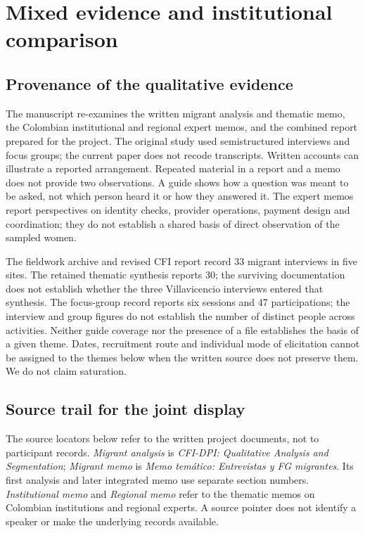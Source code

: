 \section{Mixed evidence and institutional comparison}
\subsection{Provenance of the qualitative evidence}
The manuscript re-examines the written migrant analysis and thematic memo, the Colombian institutional and regional expert memos, and the combined report prepared for the project. The original study used semistructured interviews and focus groups; the current paper does not recode transcripts. Written accounts can illustrate a reported arrangement. Repeated material in a report and a memo does not provide two observations. A guide shows how a question was meant to be asked, not which person heard it or how they answered it. The expert memos report perspectives on identity checks, provider operations, payment design and coordination; they do not establish a shared basis of direct observation of the sampled women.

The fieldwork archive and revised CFI report record 33 migrant interviews in five sites. The retained thematic synthesis reports 30; the surviving documentation does not establish whether the three Villavicencio interviews entered that synthesis. The focus-group record reports six sessions and 47 participations; the interview and group figures do not establish the number of distinct people across activities. Neither guide coverage nor the presence of a file establishes the basis of a given theme. Dates, recruitment route and individual mode of elicitation cannot be assigned to the themes below when the written source does not preserve them. We do not claim saturation.

\subsection{Source trail for the joint display}
The source locators below refer to the written project documents, not to participant records. \emph{Migrant analysis} is \emph{CFI-DPI: Qualitative Analysis and Segmentation}; \emph{Migrant memo} is \emph{Memo temático: Entrevistas y FG migrantes}. Its first analysis and later integrated memo use separate section numbers. \emph{Institutional memo} and \emph{Regional memo} refer to the thematic memos on Colombian institutions and regional experts. A source pointer does not identify a speaker or make the underlying records available.

